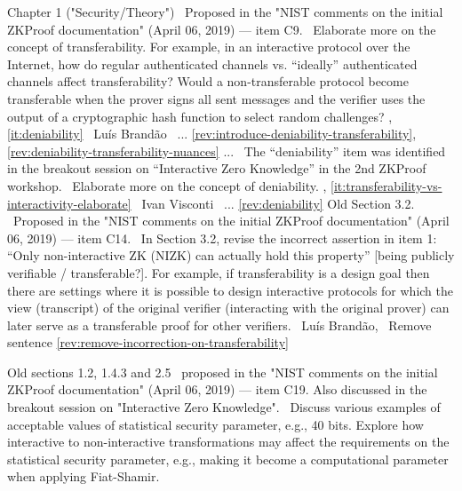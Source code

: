 Chapter 1 ("Security/Theory")
\newcol \ccontext\ Proposed in the "NIST comments on the initial ZKProof documentation" (April 06, 2019) --- item C9.
				\propContrib\ Elaborate more on the concept of transferability. For example, in an interactive protocol over the Internet, how do regular authenticated channels vs. ``ideally'' authenticated channels affect transferability? Would a non-transferable protocol become transferable when the prover signs all sent messages and the verifier uses the output of a cryptographic hash function to select random challenges? 
\newcol {}, \ref{it:deniability}
\newcol \contributors\ Luís Brandão
				\Chan\ ...
\newcol \ref{rev:introduce-deniability-transferability}, \ref{rev:deniability-transferability-nuances}
\rowendL
\incItem[it:deniability]
...
\newcol \ccontext\ The ``deniability'' item was identified in the breakout session on ``Interactive Zero Knowledge'' in the 2nd ZKProof workshop.
				\propContrib\ Elaborate more on the concept of deniability.
\newcol {}, \ref{it:transferability-vs-interactivity-elaborate}
\newcol \contributors\ Ivan Visconti
				\Chan\ ...
\newcol \ref{rev:deniability}
\rowendL
Old Section 3.2.
\newcol \ccontext\ Proposed in the "NIST comments on the initial ZKProof documentation" (April 06, 2019) --- item C14.
				\propContrib\ In Section 3.2, revise the incorrect assertion in item 1: ``Only non-interactive ZK (NIZK) can actually hold this property'' [being publicly verifiable / transferable?]. For example, if transferability is a design goal then there are settings where it is possible to design interactive protocols for which the view (transcript) of the original verifier (interacting with the original prover) can later serve as a transferable proof for other verifiers.
\newcol {}
\newcol \contributors\ Luís Brandão, 
				\Chan\ Remove sentence
\newcol \ref{rev:remove-incorrection-on-transferability}
\rowendL
\myendIssue





Old sections 1.2, 1.4.3 and 2.5
\newcol \ccontext\ proposed in the "NIST comments on the initial ZKProof documentation" (April 06, 2019) --- item C19. Also discussed in the breakout session on "Interactive Zero Knowledge".
				\propContrib\ Discuss various examples of acceptable values of statistical security parameter, e.g., 40 bits. Explore how interactive to non-interactive transformations may affect the requirements on the statistical security parameter, e.g., making it become a computational parameter when applying Fiat-Shamir.
				
